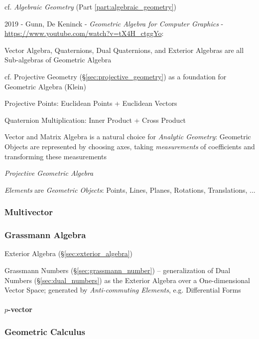 cf. \emph{Algebraic Geometry} (Part \ref{part:algebraic_geometry})

2019 - Gunn, De Keninck - \emph{Geometric Algebra for Computer Graphics} -
\url{https://www.youtube.com/watch?v=tX4H_ctggYo}:

Vector Algebra, Quaternions, Dual Quaternions, and Exterior Algebras are all
Sub-algebras of Geometric Algebra

cf. Projective Geometry (\S\ref{sec:projective_geometry}) as a foundation for
Geometric Algebra (Klein)

Projective Points: Euclidean Points + Euclidean Vectors

Quaternion Multiplication: Inner Product + Cross Product

Vector and Matrix Algebra is a natural choice for \emph{Analytic Geometry}:
Geometric Objects are represented by choosing axes, taking
\emph{measurements} of coefficients and transforming these measurements

\emph{Projective Geometric Algebra}

\emph{Elements} are \emph{Geometric Objects}: Points, Lines, Planes, Rotations,
Translations, ...



\subsubsection{Multivector}\label{sec:multivector}

\subsubsection{Grassmann Algebra}\label{sec:grassmann_algebra}


Exterior Algebra (\S\ref{sec:exterior_algebra})

\fist Grassmann Numbers (\S\ref{sec:grassmann_number}) -- generalization of Dual
Numbers (\S\ref{sec:dual_numbers}) as the Exterior Algebra over a
One-dimensional Vector Space; generated by \emph{Anti-commuting Elements}, e.g.
Differential Forms



\paragraph{$p$-vector}\label{sec:p_vector}\hfill



\subsubsection{Geometric Calculus}\label{sec:geometric_calculus}

